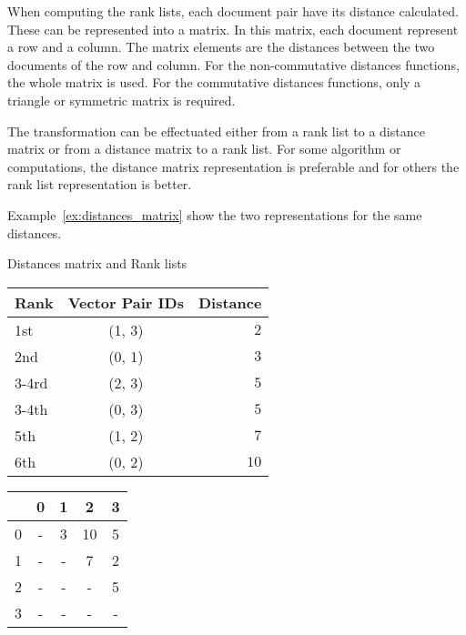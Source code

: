 When computing the rank lists, each document pair have its distance calculated.
These can be represented into a matrix.
In this matrix, each document represent a row and a column.
The matrix elements are the distances between the two documents of the row and column.
For the non-commutative distances functions, the whole matrix is used.
For the commutative distances functions, only a triangle or symmetric matrix is required.

The transformation can be effectuated either from a rank list to a distance matrix or from a distance matrix to a rank list.
For some algorithm or computations, the distance matrix representation is preferable and for others the rank list representation is better.

Example~\ref{ex:distances_matrix} show the two representations for the same distances.

\begin{example}[!t]
  \centering
  \caption{Distances matrix and Rank lists}
  \label{ex:distances_matrix}
  \begin{subexample}{\linewidth}
    \centering
    \begin{tabular}{l c r}
      \toprule
      Rank & Vector Pair IDs & Distance \\
      \midrule
      1st   & (1, 3) & $2$ \\
      2nd   & (0, 1) & $3$ \\
      3-4rd & (2, 3) & $5$ \\
      3-4th & (0, 3) & $5$ \\
      5th   & (1, 2) & $7$ \\
      6th   & (0, 2) & $10$ \\
      \bottomrule
    \end{tabular}
  \end{subexample}

  \vspace{0.5cm}

  \begin{subexample}{\linewidth}
    \centering
    \begin{tabular}{c|c c c c}
      \toprule
        & 0 & 1 & 2  & 3 \\
      \midrule
      0 & - & 3 & 10 & 5 \\
      1 & - & - & 7  & 2 \\
      2 & - & - & -  & 5 \\
      3 & - & - & -  & - \\
      \bottomrule
    \end{tabular}
  \end{subexample}
\end{example}

